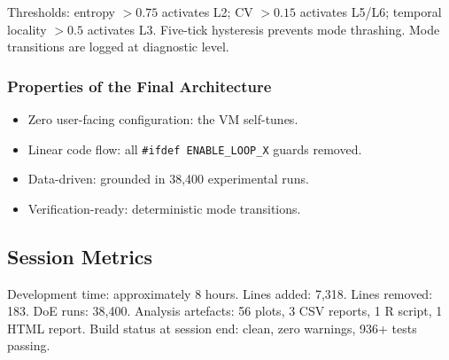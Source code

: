 Thresholds: entropy $> 0.75$ activates L2; CV $> 0.15$ activates L5/L6;
temporal locality $> 0.5$ activates L3. Five-tick hysteresis prevents mode
thrashing. Mode transitions are logged at diagnostic level.

\subsubsection{Properties of the Final Architecture}

\begin{itemize}
  \item Zero user-facing configuration: the VM self-tunes.
  \item Linear code flow: all \texttt{\#ifdef ENABLE\_LOOP\_X} guards removed.
  \item Data-driven: grounded in 38,400 experimental runs.
  \item Verification-ready: deterministic mode transitions.
\end{itemize}

\subsection{Session Metrics}

Development time: approximately 8 hours. Lines added: 7,318. Lines
removed: 183. DoE runs: 38,400. Analysis artefacts: 56 plots, 3 CSV
reports, 1 R script, 1 HTML report. Build status at session end: clean,
zero warnings, 936+ tests passing.

